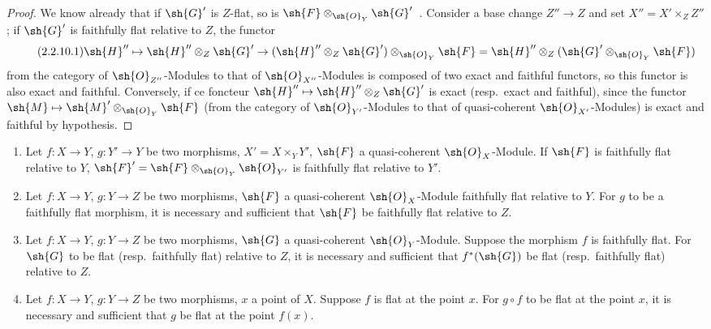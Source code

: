 \begin{proof}
We know already that if $\sh{G}'$ is $Z$-flat, so is $\sh{F}\otimes_{\sh{O}_Y}\sh{G}'$~.
Consider a base change $Z''\to Z$ and set $X''=X'\times_Z Z''$; if $\sh{G}'$ is faithfully flat relative to $Z$, the functor
\begin{equation}
\tag{2.2.10.1}
\label{IV.2.2.10.1}
\sh{H}''\mapsto\sh{H}''\otimes_Z\sh{G}'\to(\sh{H}''\otimes_Z\sh{G}')\otimes_{\sh{O}_Y}\sh{F}=\sh{H}''\otimes_Z(\sh{G}'\otimes_{\sh{O}_Y}\sh{F})
\end{equation}
from the category of $\sh{O}_{Z''}$-Modules to that of $\sh{O}_{X''}$-Modules is composed of two exact and faithful functors, so this functor is also exact and faithful.
Conversely, if ce foncteur $\sh{H}''\mapsto\sh{H}''\otimes_Z\sh{G}'$ is exact (resp.\ exact and faithful), since the functor $\sh{M}\mapsto\sh{M}'\otimes_{\sh{O}_Y}\sh{F}$ (from the category of $\sh{O}_{Y'}$-Modules to that of quasi-coherent $\sh{O}_{X'}$-Modules) is exact and faithful by hypothesis.
\end{proof}

\begin{corollary}[2.2.11]
\label{IV.2.2.11}
\medskip\noindent
\begin{enumerate}[label=(\roman*)]
  \item Let $f:X\to Y$, $g:Y'\to Y$ be two morphisms, $X'=X\times_Y Y'$, $\sh{F}$ a quasi-coherent $\sh{O}_X$-Module. If $\sh{F}$ is faithfully flat relative to $Y$, $\sh{F}'=\sh{F}\otimes_{\sh{O}_Y}\sh{O}_{Y'}$ is faithfully flat relative to $Y'$.
  \item Let $f:X\to Y$, $g:Y\to Z$ be two morphisms, $\sh{F}$ a quasi-coherent $\sh{O}_X$-Module faithfully flat relative to $Y$.
    For $g$ to be a faithfully flat morphism, it is necessary and sufficient that $\sh{F}$ be faithfully flat relative to $Z$.
  \item Let $f:X\to Y$, $g:Y\to Z$ be two morphisms, $\sh{G}$ a quasi-coherent $\sh{O}_Y$-Module.
    Suppose the morphism $f$ is faithfully flat.
    For $\sh{G}$ to be flat \textnormal{(}resp.\ faithfully flat\textnormal{)} relative to $Z$, it is necessary and sufficient that $f^*(\sh{G})$ be flat \textnormal{(}resp.\ faithfully flat\textnormal{)} relative to $Z$.
  \item Let $f:X\to Y$, $g:Y\to Z$ be two morphisms, $x$ a point of $X$.
    Suppose $f$ is flat at the point $x$. For $g\circ f$ to be flat at the point $x$, it is necessary and sufficient that $g$ be flat at the point $f(x)$.
\end{enumerate}
\end{corollary}

